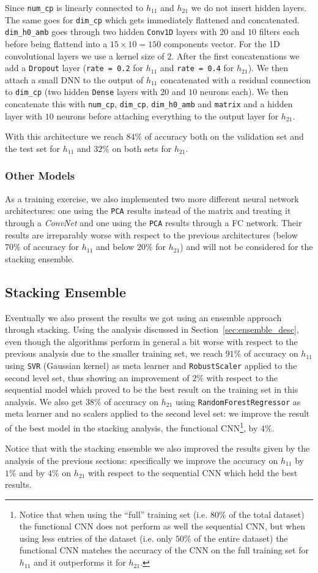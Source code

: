         Since \texttt{num\_cp} is linearly connected to $h_{11}$ and $h_{21}$ we do not insert hidden layers. The same goes for \texttt{dim\_cp} which gets immediately flattened and concatenated. \texttt{dim\_h0\_amb} goes through two hidden \texttt{Conv1D} layers with $20$ and $10$ filters each before being flattend into a $15 \times 10 = 150$ components vector. For the 1D convolutional layers we use a kernel size of $2$. After the first concatenations we add a \texttt{Dropout} layer (\texttt{rate = 0.2} for $h_{11}$ and \texttt{rate = 0.4} for $h_{21}$). We then attach a small DNN to the output of $h_{11}$ concatenated with a residual connection to \texttt{dim\_cp} (two hidden \texttt{Dense} layers with $20$ and $10$ neurons each). We then concatenate this with \texttt{num\_cp}, \texttt{dim\_cp}, \texttt{dim\_h0\_amb} and \texttt{matrix} and a hidden layer with $10$ neurons before attaching everything to the output layer for $h_{21}$.
        
        With this architecture we reach $84\%$ of accuracy both on the validation set and the test set for $h_{11}$ and $32\%$ on both sets for $h_{21}$.
        
    \subsubsection{Other Models}
        As a training exercise, we also implemented two more different neural network architectures: one using the \texttt{PCA} results instead of the matrix and treating it through a \textit{ConvNet} and one using the \texttt{PCA} results through a FC network. Their results are irreparably worse with respect to the previous architectures (below $70\%$ of accuracy for $h_{11}$ and below $20\%$ for $h_{21}$) and will not be considered for the stacking ensemble.
        
\subsection{Stacking Ensemble}
    Eventually we also present the results we got using an ensemble approach through stacking. Using the analysis discussed in Section~\ref{sec:ensemble_desc}, even though the algorithms perform in general a bit worse with respect to the previous analysis due to the smaller training set, we reach $91\%$ of accuracy on $h_{11}$ using \texttt{SVR} (Gaussian kernel) as meta learner and \texttt{RobustScaler} applied to the second level set, thus showing an improvement of $2\%$ with respect to the sequential model which proved to be the best result on the training set in this analysis. We also get $38\%$ of accuracy on $h_{21}$ using \texttt{RandomForestRegressor} as meta learner and no scalers applied to the second level set: we improve the result of the best model in the stacking analysis, the functional CNN\footnote{Notice that when using the ``full'' training set (i.e. $80\%$ of the total dataset) the functional CNN does not perform as well the sequential CNN, but when using less entries of the dataset (i.e. only $50\%$ of the entire dataset) the functional CNN matches the accuracy of the CNN on the full training set for $h_{11}$ and it outperforms it for $h_{21}$.}, by $4\%$.
    
    Notice that with the stacking ensemble we also improved the results given by the analysis of the previous sections: specifically we improve the accuracy on $h_{11}$ by $1\%$ and by $4\%$ on $h_{21}$ with respect to the sequential CNN which held the best results.